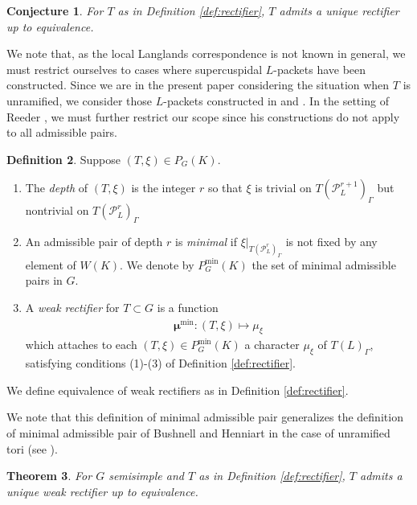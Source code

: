 \documentclass{compositio}
\theoremstyle{plain}
\newtheorem{theorem}{Theorem}[section]
\newtheorem{conjecture}[theorem]{Conjecture}
\theoremstyle{definition}
\newtheorem{definition}[theorem]{Definition}
\newcommand{\PL}{\mathcal{P}_L}
\newcommand{\Pmin}{P_G^{\min}}
\newcommand{\bmu}{\boldsymbol\mu}
\newcommand{\mumin}{\bmu^{\min}}
\begin{document}
\begin{conjecture} \label{conj:unique_rectifier}
For $T$ as in Definition \ref{def:rectifier}, $T$ admits a unique rectifier up to equivalence.
\end{conjecture}

We note that, as the local Langlands correspondence is not known in general, we must restrict
ourselves to cases where supercuspidal $L$-packets have been constructed.
Since we are in the present paper considering the situation when $T$ is unramified,
we consider those $L$-packets constructed in \cite{reeder-debacker:09a} and \cite{reeder:08a}.
In the setting of Reeder \cite{reeder:08a},
we must further restrict our scope since his constructions do not apply to all admissible pairs.

\begin{definition}\label{def:general_pair}
Suppose $(T, \xi) \in P_G(K)$.
\begin{enumerate}
\item The \emph{depth} of $(T, \xi)$ is the integer $r$ so that $\xi$
is trivial on $T(\PL^{r+1})_{\Gamma}$ but nontrivial on
$T(\PL^{r})_{\Gamma}$
\item An admissible pair of depth $r$ is \emph{minimal}
if $\xi|_{T(\PL^{r})_{\Gamma}}$
is not fixed by any element of $W(K)$.
We denote by $\Pmin(K)$ the set
of minimal admissible pairs in $G$.
\item A \emph{weak rectifier} for $T \subset G$ is a function
\begin{align*}
\mumin : (T, \xi) \mapsto \mu_{\xi}
\end{align*}
which attaches to each $(T, \xi) \in \Pmin(K)$ a character
  $\mu_{\xi}$ of $T(L)_{\Gamma}$, satisfying conditions (1)-(3)
  of Definition \ref{def:rectifier}.
\end{enumerate}
We define equivalence of weak rectifiers as in Definition \ref{def:rectifier}.
\end{definition}

We note that this definition of minimal admissible pair generalizes
the definition of minimal admissible pair of Bushnell and Henniart in
the case of unramified tori (see \cite[\S2.2]{bushnell-henniart:05a}).

\begin{theorem} \label{thm:unique_semisimple}
For $G$ semisimple and $T$ as in Definition \ref{def:rectifier}, $T$ admits a unique weak rectifier up to equivalence.
\end{theorem}
\end{document}
